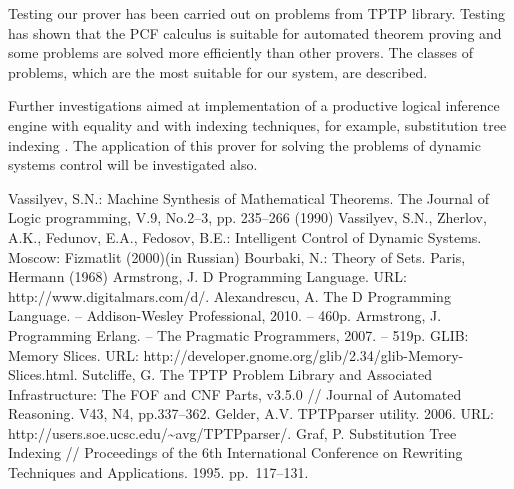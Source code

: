 \documentclass[runningheads,a4paper]{llncs}
\begin{document}
Testing our prover has been carried out on problems from TPTP library. Testing has shown that the PCF calculus is suitable for automated theorem proving and some problems are solved more efficiently than other provers. The classes of problems, which are the most suitable for our system, are described.

Further investigations aimed at implementation of a productive logical inference engine with equality and with indexing techniques, for example, substitution tree indexing \cite{subtree}. The application of this prover for solving the problems of dynamic systems control will be investigated also.



\begin{thebibliography}{4}

 Vassilyev, S.N.: Machine Synthesis of Mathematical Theorems. The Journal of Logic programming, V.9, No.2--3, pp. 235--266 (1990)
 Vassilyev, S.N., Zherlov, A.K., Fedunov, E.A.,
Fedosov, B.E.: Intelligent Control of Dynamic Systems. Moscow: Fizmatlit (2000)(in Russian)
 Bourbaki, N.: Theory of Sets. Paris, Hermann (1968)
 Armstrong, J. D Programming Language. URL: http://www.digitalmars.com/d/.
 Alexandrescu, A. The D Programming Language. -- Addison-Wesley Professional, 2010. -- 460p.
 Armstrong, J. Programming Erlang.  -- The Pragmatic Programmers, 2007. -- 519p.
 GLIB: Memory Slices. URL: http://developer.gnome.org/glib/2.34/glib-Memory-Slices.html.
 Sutcliffe, G. The TPTP Problem Library and Associated Infrastructure: The FOF and CNF Parts, v3.5.0 // Journal of Automated Reasoning. V43, N4, pp.337--362.
 Gelder, A.V. TPTPparser utility. 2006. URL: http://users.soe.ucsc.edu/\~{}avg/TPTPparser/.
 Graf, P. Substitution Tree Indexing // Proceedings of the 6th International Conference on Rewriting Techniques and Applications. 1995. pp.~117--131.



\end{thebibliography}
\end{document}
